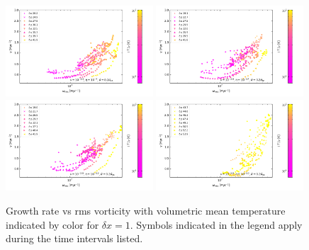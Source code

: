 \documentclass[preprint2]{aastex63}
\newcommand\dx{ {\delta x}}
\begin{document}
\begin{figure}
\centering
\includegraphics[trim=0.2cm 1.4cm 0.5cm 0.2cm,clip=true,width=0.49\textwidth]{csc_figs/gvw-1pcPm10e-4.0.png}
\includegraphics[trim=0.2cm 1.4cm 0.5cm 0.2cm,clip=true,width=0.49\textwidth]{csc_figs/gvw-1pcPm5e-3.7.png}
\includegraphics[trim=0.2cm 0.2cm 0.5cm 0.2cm,clip=true,width=0.49\textwidth]{csc_figs/gvw-1pcPm2e-3.3.png}
\includegraphics[trim=0.2cm 0.2cm 0.5cm 0.2cm,clip=true,width=0.49\textwidth]{csc_figs/gvw-1pcPm1e-3.0.png}
\caption{
Growth rate vs rms vorticity with volumetric mean temperature indicated by 
color for $\dx=1$.
Symbols indicated in the legend apply during the time intervals listed.
\label{fig:lsd-power}
}
\end{figure}
\end{document}
